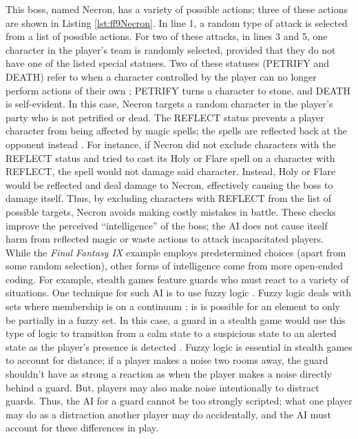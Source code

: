This boss, named Necron, has a variety of possible actions; three of these actions are shown in Listing \ref{lst:ff9Necron}. In line 1, a random type of attack is selected from a list of possible actions. For two of these attacks, in lines 3 and 5, one character in the player's team is randomly selected, provided that they do not have one of the listed special statuses. Two of these statuses (PETRIFY and DEATH) refer to when a character controlled by the player can no longer perform actions of their own \cite{ffIX00}; PETRIFY turns a character to stone, and DEATH is self-evident. In this case, Necron targets a random character in the player's party who is not petrified or dead. The REFLECT status prevents a player character from being affected by magic spells; the spells are reflected back at the opponent instead \cite{ffIX00}. For instance, if Necron did not exclude characters with the REFLECT status and tried to cast its Holy or Flare spell on a character with REFLECT, the spell would not damage said character. Instead, Holy or Flare would be reflected and deal damage to Necron, effectively causing the boss to damage itself. Thus, by excluding characters with REFLECT from the list of possible targets, Necron avoids making costly mistakes in battle. These checks improve the perceived ``intelligence'' of the boss; the AI does not cause itself harm from reflected magic or waste actions to attack incapacitated players.\\

While the \textit{Final Fantasy IX} example employs predetermined choices (apart from some random selection), other forms of intelligence come from more open-ended coding. For example, stealth games feature guards who must react to a variety of situations. One technique for such AI is to use fuzzy logic \cite{schw04}. Fuzzy logic deals with sets where membership is on a continuum \cite{zade65}; is is possible for an element to only be partially in a fuzzy set. In this case, a guard in a stealth game would use this type of logic to transition from a calm state to a suspicious state to an alerted state as the player's presence is detected \cite{schw04}. Fuzzy logic is essential in stealth games to account for distance; if a player makes a noise two rooms away, the guard shouldn't have as strong a reaction as when the player makes a noise directly behind a guard. But, players may also make noise intentionally to distract guards. Thus, the AI for a guard cannot be too strongly scripted; what one player may do as a distraction another player may do accidentally, and the AI must account for these differences in play.\\

